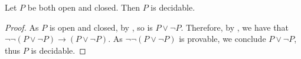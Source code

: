 \begin{corollary}\label{OpenAndClosedMeansDecidable}
  Let $P$ be both open and closed. 
  Then $P$ is decidable. 
\end{corollary} 
\begin{proof}
  As $P$ is open and closed, by ,  so is $P\vee \neg P$. 
  Therefore, by , we have that $\neg \neg (P\vee \neg P) \to (P\vee \neg P)$. 
  As $\neg \neg (P\vee \neg P)$ is provable, we conclude $P\vee \neg P$, thus $P$ is decidable. 
\end{proof}



